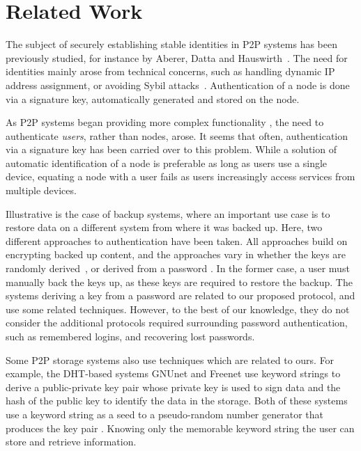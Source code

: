 \section{Related Work} 

The subject of securely establishing stable identities in P2P systems has been
previously studied, for instance by Aberer, Datta and
Hauswirth~\cite{AbererDH04}. The need for identities mainly arose from
technical concerns, such as handling dynamic IP address assignment, or
avoiding Sybil attacks~\cite{Douceur02}. Authentication of a node is done via
a signature key, automatically generated and stored on the node.

As P2P systems began providing more complex functionality
\cite{IsdalPKA10,Cutillo09a,AbbasPES09,LillibridgeEBBI03}, the need to authenticate
\emph{users}, rather than nodes, arose. It seems that often, authentication
via a signature key has been carried over to this problem. While a solution
of automatic identification of a node is preferable as long as users use a
single device, equating a node with a user fails as users increasingly access
services from multiple devices.

Illustrative is the case of backup systems, where an important use case is to
restore data on a different system from where it was backed up. Here, two
different approaches to authentication have been taken. All approaches build
on encrypting backed up content, and the approaches vary in whether the keys
are randomly derived~\cite{LillibridgeEBBI03}, or derived from a password
\cite{CoxMN02}. In the former case, a user must manually
back the keys up, as these keys are required to restore the backup. The
systems deriving a key from a password are related to our proposed protocol,
and use some related techniques. However, to the best of our knowledge, they
do not consider the additional protocols required surrounding password
authentication, such as remembered logins, and recovering lost passwords.

Some P2P storage systems also use techniques which are related to ours.
For example, the DHT-based systems 
GNUnet and Freenet use keyword strings to derive a public-private key pair
whose private key is used to sign data and the hash of the public key to
identify the data in the storage. Both of these systems use a keyword string
as a seed to a pseudo-random number generator that produces the key pair
\cite{Clarke10,Bennett03}. Knowing only the memorable keyword string the user
can store and retrieve information.

